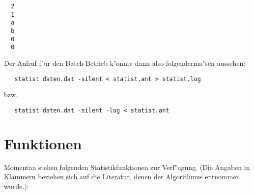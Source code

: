 \documentclass[a4paper,11pt]{article}
\begin{document}
\begin{verbatim}
  2
  1
  a
  b
  0
  0
\end{verbatim}

Der Aufruf f"ur den Batch-Betrieb k"onnte dann also folgenderma"sen
aussehen:

\verb|   statist daten.dat -silent < statist.ant > statist.log | \par
{\centering bzw.\\}\par
\verb|   statist daten.dat -silent -log < statist.ant   |


\section{Funktionen}
\label{sec:funktionen}

Momentan stehen folgenden Statistikfunktionen zur Verf"ugung. (Die
Angaben in Klammern beziehen sich auf die Literatur, denen der
Algorithmus entnommen wurde.):
\end{document}
